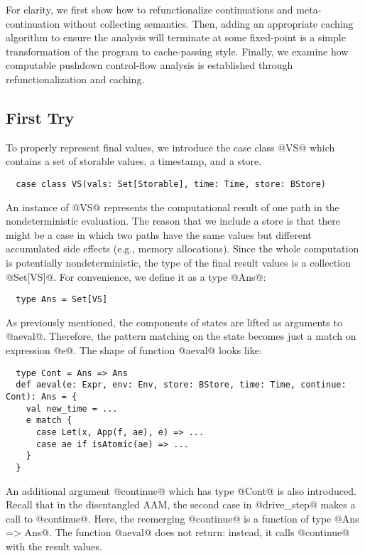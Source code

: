 \documentclass[acmsmall, review]{acmart}\settopmatter{}
\begin{document}
For clarity, we first show how to refunctionalize continuations and meta-continuation 
without collecting semantics.
Then, adding an appropriate caching algorithm to ensure the analysis will
terminate at some fixed-point is a simple transformation of the program to cache-passing
style. Finally, we examine how computable pushdown control-flow analysis is established
through refunctionalization and caching.

\subsection{First Try}

To properly represent final values, we introduce the case class @VS@ which
contains a set of storable values, a timestamp, and a store.

\begin{lstlisting}
  case class VS(vals: Set[Storable], time: Time, store: BStore)
\end{lstlisting}

An instance of @VS@ represents the computational result of one path in
the nondeterministic evaluation. 
The reason that we include a store is that there might be a case in which two paths
have the same values but different accumulated side effects (e.g., memory allocations).
Since the whole computation is potentially nondeterministic, the type of the final result
values is a collection @Set[VS]@. For convenience, we define it as a type @Ans@:

\begin{lstlisting}
  type Ans = Set[VS]
\end{lstlisting}

As previously mentioned, the components of states are lifted as arguments to
@aeval@. Therefore, the pattern matching on the state becomes just a match on
expression @e@. The shape of function @aeval@ looks like:

\begin{lstlisting}
  type Cont = Ans => Ans
  def aeval(e: Expr, env: Env, store: BStore, time: Time, continue: Cont): Ans = {
    val new_time = ...
    e match {
      case Let(x, App(f, ae), e) => ...
      case ae if isAtomic(ae) => ...
    }
  }
\end{lstlisting}

An additional argument @continue@ which has type @Cont@ is also introduced.
Recall that in the disentangled AAM, the second case in @drive_step@
makes a call to @continue@. Here, the reemerging @continue@ is a function
of type @Ans => Ans@. The function @aeval@ does not return: instead, it calls
@continue@ with the result values. \\
\end{document}

